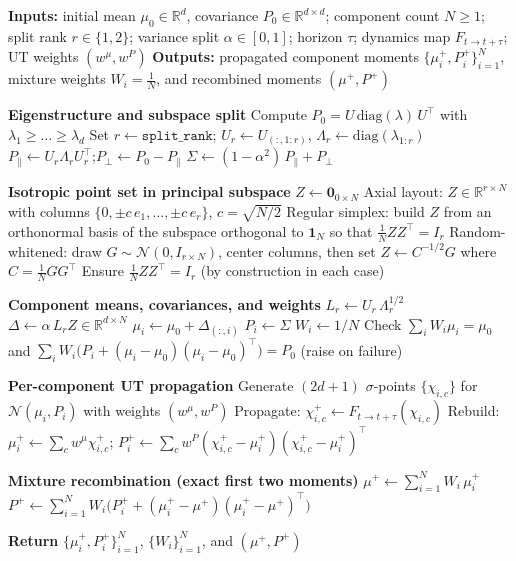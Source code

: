 \begin{algorithm}[H]
\caption{Mixture Unscented Transform with Moment-Preserving Axial Splitting (M-UT)}
\label{alg:mut_moment_split}
\begin{algorithmic}[1]
\State \textbf{Inputs:} initial mean $\mu_0\in\mathbb{R}^d$, covariance $P_0\in\mathbb{R}^{d\times d}$; component count $N\ge 1$; split rank \(r\in\{1,2\}\); variance split $\alpha\in[0,1]$; horizon $\tau$; dynamics map $F_{t\to t+\tau}$; UT weights $(w^\mu,w^P)$
\State \textbf{Outputs:} propagated component moments $\{\mu_i^+,P_i^+\}_{i=1}^N$, mixture weights $W_i=\tfrac{1}{N}$, and recombined moments $(\mu^+,P^+)$
\Statex

\State \textbf{Eigenstructure and subspace split}
\State Compute $P_0 = U\,\mathrm{diag}(\lambda)\,U^\top$ with $\lambda_1\ge\dots\ge\lambda_d$
\State Set $r \gets \texttt{split\_rank}$; $U_r \gets U_{(:,1\!:\!r)}$, $\Lambda_r \gets \mathrm{diag}(\lambda_{1:r})$
\State $P_{\parallel} \gets U_r \Lambda_r U_r^\top$;\quad $P_{\perp} \gets P_0 - P_{\parallel}$
\State $\Sigma \gets (1-\alpha^2)\,P_{\parallel} + P_{\perp}$ 

\Statex
\State \textbf{Isotropic point set in principal subspace}
  \State $Z \gets \mathbf{0}_{0\times N}$
  \State Axial layout: $Z\in\mathbb{R}^{r\times N}$ with columns $\{0,\pm c\,e_1,\ldots,\pm c\,e_r\}$, $c=\sqrt{N/2}$
  \State Regular simplex: build $Z$ from an orthonormal basis of the subspace orthogonal to $\mathbf{1}_N$ so that $\tfrac{1}{N}ZZ^\top=I_r$
\Else
  \State Random-whitened: draw $G\sim\mathcal{N}(0,I_{r\times N})$, center columns, then set $Z\gets C^{-1/2}G$ where $C=\tfrac{1}{N}GG^\top$
\EndIf
\State Ensure $\tfrac{1}{N}ZZ^\top=I_r$ (by construction in each case)

\Statex
\State \textbf{Component means, covariances, and weights}
\State $L_r \gets U_r\,\Lambda_r^{1/2}$
\State $\Delta \gets \alpha\,L_r Z\in\mathbb{R}^{d\times N}$
  \State $\mu_i \gets \mu_0 + \Delta_{(:,i)}$
  \State $P_i \gets \Sigma$
  \State $W_i \gets 1/N$
\EndFor
{}
  \State Check $\sum_i W_i\mu_i = \mu_0$ and $\sum_i W_i\!\big(P_i+(\mu_i-\mu_0)(\mu_i-\mu_0)^\top\big)=P_0$ (raise on failure)
\EndIf

\Statex
\State \textbf{Per-component UT propagation}
  \State Generate $(2d+1)$ $\sigma$-points $\{\chi_{i,c}\}$ for $\mathcal{N}(\mu_i,P_i)$ with weights $(w^\mu,w^P)$
  \State Propagate: $\chi_{i,c}^+ \gets F_{t\to t+\tau}(\chi_{i,c})$
  \State Rebuild: $\mu_i^+ \gets \sum_{c} w^\mu \chi_{i,c}^+$;\quad
         $P_i^+ \gets \sum_{c} w^P(\chi_{i,c}^+-\mu_i^+)(\chi_{i,c}^+-\mu_i^+)^\top$
\EndFor

\Statex
\State \textbf{Mixture recombination (exact first two moments)}
\State $\mu^+ \gets \sum_{i=1}^N W_i\,\mu_i^+$
\State $P^+ \gets \sum_{i=1}^N W_i\!\Big(P_i^+ + (\mu_i^+-\mu^+)(\mu_i^+-\mu^+)^\top\Big)$

\State \textbf{Return} $\{\mu_i^+,P_i^+\}_{i=1}^N$, $\{W_i\}_{i=1}^N$, and $(\mu^+,P^+)$
\end{algorithmic}
\end{algorithm}


